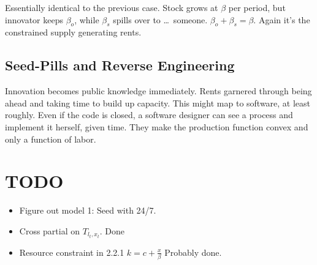 \documentclass[11pt]{article}
\begin{document}
  Essentially identical to the previous case.  Stock grows at $\beta$ per period, but innovator keeps $\beta_o$, while $\beta_s$ spills over to \ldots\ someone.  $\beta_o + \beta_s = \beta$.  Again it's the constrained supply generating rents.

\subsection{Seed-Pills and Reverse Engineering}
\label{sub:seed_pills_and_reverse_engineering}
  
  Innovation becomes public knowledge immediately.  Rents garnered through being ahead and taking time to build up capacity.  This might map to software, at least roughly.  Even if the code is closed, a software designer can see a process and implement it herself, given time.  They make the production function convex and only a function of labor.

\section{TODO}
\label{sec:todo}

  \begin{itemize}
    \item Figure out model 1: Seed with 24/7.
    \item Cross partial on $T_{l_t,x_t}$. Done
    \item Resource constraint in 2.2.1 $k = c + \frac{x}{\beta}$ Probably done.
  \end{itemize}
  


\label{bib:bibliography}
\end{document}
